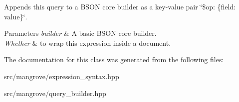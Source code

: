 Appends this query to a B\+S\+ON core builder as a key-\/value pair \char`\"{}\$op\+: \{field\+: value\}\char`\"{}. 


\begin{DoxyParams}{Parameters}
{\em builder} & A basic B\+S\+ON core builder. \\
\hline
{\em Whether} & to wrap this expression inside a document. \\
\hline
\end{DoxyParams}


The documentation for this class was generated from the following files\+:\begin{DoxyCompactItemize}
\item 
src/mangrove/expression\+\_\+syntax.\+hpp\item 
src/mangrove/query\+\_\+builder.\+hpp\end{DoxyCompactItemize}
